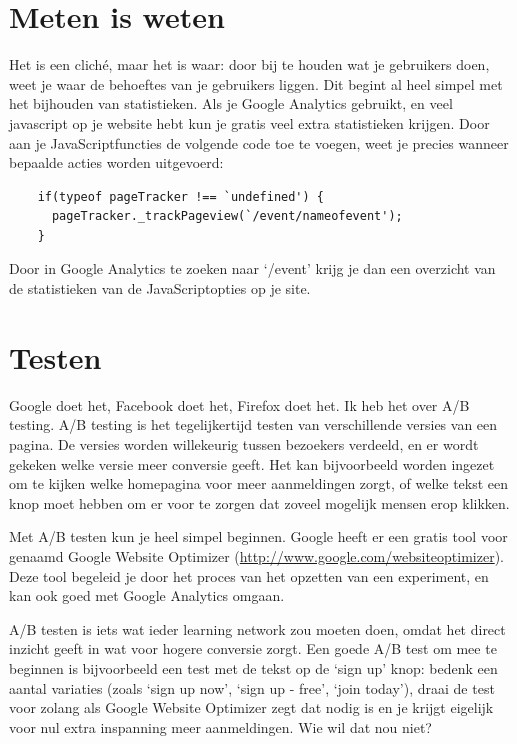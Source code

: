 \documentclass[a4paper, 10pt, pdftex]{report}
\begin{document}
    \section{Meten is weten}
      Het is een clich\'e, maar het is waar: door bij te houden wat je gebruikers doen, weet je waar de behoeftes van je gebruikers liggen. Dit begint al heel simpel met het bijhouden van statistieken. Als je Google Analytics gebruikt, en veel javascript op je website hebt kun je gratis veel extra statistieken krijgen. Door aan je JavaScriptfuncties de volgende code toe te voegen, weet je precies wanneer bepaalde acties worden uitgevoerd:

    \begin{verbatim}
    if(typeof pageTracker !== `undefined') {
      pageTracker._trackPageview(`/event/nameofevent');
    }
    \end{verbatim}

    Door in Google Analytics te zoeken naar `/event' krijg je dan een overzicht van de statistieken van de JavaScriptopties op je site.

    \section{Testen}
      Google doet het, Facebook doet het, Firefox doet het. Ik heb het over A/B testing. A/B testing is het tegelijkertijd testen van verschillende versies van een pagina. De versies worden willekeurig tussen bezoekers verdeeld, en er wordt gekeken welke versie meer conversie geeft. Het kan bijvoorbeeld worden ingezet om te kijken welke homepagina voor meer aanmeldingen zorgt, of welke tekst een knop moet hebben om er voor te zorgen dat zoveel mogelijk mensen erop klikken.

      Met A/B testen kun je heel simpel beginnen. Google heeft er een gratis tool voor genaamd Google Website Optimizer (\url{http://www.google.com/websiteoptimizer}). Deze tool begeleid je door het proces van het opzetten van een experiment, en kan ook goed met Google Analytics omgaan.

      A/B testen is iets wat ieder learning network zou moeten doen, omdat het direct inzicht geeft in wat voor hogere conversie zorgt. Een goede A/B test om mee te beginnen is bijvoorbeeld een test met de tekst op de `sign up' knop: bedenk een aantal variaties (zoals `sign up now', `sign up - free', `join today'), draai de test voor zolang als Google Website Optimizer zegt dat nodig is en je krijgt eigelijk voor nul extra inspanning meer aanmeldingen. Wie wil dat nou niet?
\end{document}
